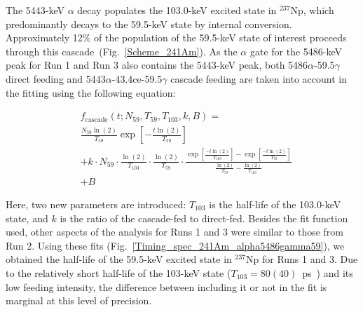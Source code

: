 \documentclass[aps,UTF8,prc,twocolumn,preprintnumbers,amsmath,amssymb,floatfix]{revtex4-2}
\begin{document}
The 5443-keV $\alpha$ decay populates the 103.0-keV excited state in $^{237}$Np, which predominantly decays to the 59.5-keV state by internal conversion. Approximately 12\% of the population of the 59.5-keV state of interest proceeds through this cascade~(Fig.~\ref{Scheme_241Am}). As the $\alpha$ gate for the 5486-keV peak for Run 1 and Run 3 also contains the 5443-keV peak, both 5486$\alpha$-59.5$\gamma$ direct feeding and 5443$\alpha$-43.4ce-59.5$\gamma$ cascade feeding are taken into account in the fitting using the following equation: 

\begin{equation}
\begin{split}
& f_{\text{cascade}}(t; N_{59}, T_{59}, T_{103}, k, B) = \\
& \frac{N_{59} \ln(2)}{T_{59}} \exp\left[-\frac{t \ln(2)}{T_{59}}\right] \\
& + k \cdot N_{59} \cdot \frac{\ln(2)}{T_{103}} \cdot \frac{\ln(2)}{T_{59}} \cdot \frac{ \exp\left[ \frac{-t \ln(2)}{T_{103}}\right] - \exp\left[\frac{-t \ln(2)}{T_{59}}\right]}{ \frac{\ln(2)}{T_{59}} - \frac{\ln(2)}{T_{103}}} \\
& + B
\label{eq:Cascade}
\end{split}
\end{equation}

Here, two new parameters are introduced: $T_{103}$ is the half-life of the 103.0-keV state, and $k$ is the ratio of the cascade-fed to direct-fed. Besides the fit function used, other aspects of the analysis for Runs 1 and 3 were similar to those from Run 2. Using these fits (Fig.~\ref{Timing_spec_241Am_alpha5486gamma59}), we obtained the half-life of the 59.5-keV excited state in $^{237}$Np for Runs 1 and 3. Due to the relatively short half-life of the 103-keV state ($T_{103}=80(40)$~ps~\cite{Basunia_NDS2006_A237}) and its low feeding intensity, the difference between including it or not in the fit is marginal at this level of precision. 

\end{document}
